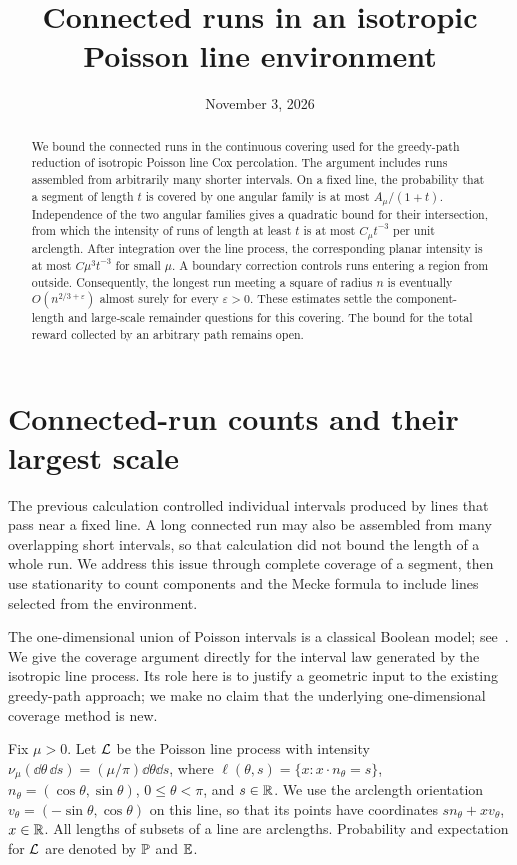 \documentclass[11pt,letterpaper]{article}
\title{Connected runs in an isotropic Poisson line environment}
\author{}
\date{November 3, 2026}
\begin{document}
\maketitle
\begin{abstract}
We bound the connected runs in the continuous covering used for the greedy-path reduction of isotropic Poisson line Cox percolation. The argument includes runs assembled from arbitrarily many shorter intervals. On a fixed line, the probability that a segment of length $t$ is covered by one angular family is at most $A_\mu/(1+t)$. Independence of the two angular families gives a quadratic bound for their intersection, from which the intensity of runs of length at least $t$ is at most $C_\mu t^{-3}$ per unit arclength. After integration over the line process, the corresponding planar intensity is at most $C\mu^3t^{-3}$ for small $\mu$. A boundary correction controls runs entering a region from outside. Consequently, the longest run meeting a square of radius $n$ is eventually $O(n^{2/3+\varepsilon})$ almost surely for every $\varepsilon>0$. These estimates settle the component-length and large-scale remainder questions for this covering. The bound for the total reward collected by an arbitrary path remains open.
\end{abstract}

\section{Connected-run counts and their largest scale}

The previous calculation controlled individual intervals produced by lines that pass near a fixed line. A long connected run may also be assembled from many overlapping short intervals, so that calculation did not bound the length of a whole run. We address this issue through complete coverage of a segment, then use stationarity to count components and the Mecke formula to include lines selected from the environment.

The one-dimensional union of Poisson intervals is a classical Boolean model; see~\cite[Chapter~17]{LP17}. We give the coverage argument directly for the interval law generated by the isotropic line process. Its role here is to justify a geometric input to the existing greedy-path approach; we make no claim that the underlying one-dimensional coverage method is new.

Fix $\mu>0$. Let $\cL$ be the Poisson line process with intensity $\nu_\mu(\dd\theta\,\dd s)=(\mu/\pi)\dd\theta\dd s$, where $\ell(\theta,s)=\{x:x\cdot n_\theta=s\}$, $n_\theta=(\cos\theta,\sin\theta)$, $0\le\theta<\pi$, and $s\in\R$. We use the arclength orientation $v_\theta=(-\sin\theta,\cos\theta)$ on this line, so that its points have coordinates $s n_\theta+xv_\theta$, $x\in\R$. All lengths of subsets of a line are arclengths. Probability and expectation for $\cL$ are denoted by $\P$ and $\E$.
\end{document}
